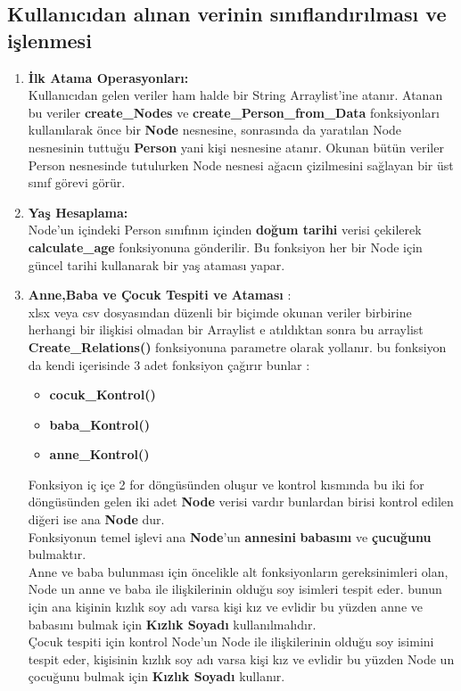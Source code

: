 \documentclass[conference]{IEEEtran}
\begin{document}
\subsection{Kullanıcıdan alınan verinin sınıflandırılması ve işlenmesi}
\begin{enumerate}
    \item \textbf{İlk Atama Operasyonları:}\\Kullanıcıdan gelen veriler ham halde bir String Arraylist'ine atanır. Atanan bu veriler \textbf{create\_Nodes} ve \textbf{create\_Person\_from\_Data} fonksiyonları kullanılarak önce bir \textbf{Node} nesnesine, sonrasında da yaratılan Node nesnesinin tuttuğu \textbf{Person} yani kişi nesnesine atanır. Okunan bütün veriler Person nesnesinde tutulurken Node nesnesi ağacın çizilmesini sağlayan bir üst sınıf görevi görür.
    \item \textbf{Yaş Hesaplama:}\\ Node'un içindeki Person sınıfının içinden \textbf{doğum tarihi} verisi çekilerek \textbf{calculate\_age} fonksiyonuna gönderilir. Bu fonksiyon her bir Node için güncel tarihi kullanarak bir yaş ataması yapar.
    \item \textbf{Anne,Baba ve Çocuk Tespiti ve Ataması} :\\
    xlsx veya csv dosyasından düzenli bir biçimde okunan veriler birbirine herhangi bir ilişkisi olmadan bir Arraylist e atıldıktan sonra bu arraylist
    \textbf{Create\_Relations()} fonksiyonuna parametre olarak yollanır. bu fonksiyon da kendi içerisinde 3 adet fonksiyon çağırır bunlar : 
    \begin{itemize}
    \item \textbf{cocuk\_Kontrol()}
    \item \textbf{baba\_Kontrol()}
    \item \textbf{anne\_Kontrol()}
    \end{itemize}
    Fonksiyon iç içe 2 for döngüsünden oluşur ve kontrol kısmında bu iki for döngüsünden gelen iki adet \textbf{Node} verisi vardır bunlardan birisi kontrol edilen diğeri ise ana \textbf{Node} dur.\\ Fonksiyonun temel işlevi ana \textbf{Node}'un \textbf{annesini} \textbf{babasını} ve \textbf{çucuğunu} bulmaktır.\\ Anne ve baba bulunması için öncelikle alt fonksiyonların gereksinimleri olan, Node un anne ve baba ile ilişkilerinin olduğu soy isimleri tespit eder. bunun için ana kişinin kızlık soy adı varsa kişi kız ve evlidir bu yüzden anne ve babasını bulmak için \textbf{Kızlık Soyadı} kullanılmalıdır.\\ Çocuk tespiti için kontrol Node'un Node ile ilişkilerinin olduğu soy isimini tespit eder, kişisinin kızlık soy adı varsa kişi kız ve evlidir bu yüzden Node un çocuğunu bulmak için \textbf{Kızlık Soyadı} kullanır.\\

\end{enumerate}
\end{document}

